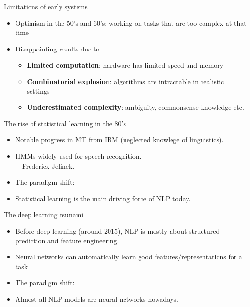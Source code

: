 \documentclass[usenames,dvipsnames,notes,11pt,aspectratio=169]{beamer}
\begin{document}
\begin{frame}
    {Limitations of early systems}
    \begin{itemize}
        \itemsep1em
        \item Optimism in the 50's and 60's: working on tasks that are too complex at that time\\[1ex]
        \item Disappointing results due to
            \begin{itemize}
                \item \textbf{Limited computation}: hardware has limited speed and memory 
                \item \textbf{Combinatorial explosion}: algorithms are intractable in realistic settings
                \item \textbf{Underestimated complexity}: ambiguity, commonsense knowledge etc.
            \end{itemize}
    \end{itemize}
\end{frame}

\begin{frame}
    {The rise of statistical learning in the 80's}
    \begin{itemize}
        \itemsep1em
        \item Notable progress in MT from IBM (neglected knowlege of linguistics).
        \item HMMs widely used for speech recognition.\\
            ---Frederick Jelinek.
        \item The paradigm shift: 
        \item Statistical learning is the main driving force of NLP today.
    \end{itemize}
\end{frame}

\begin{frame}
    {The deep learning tsunami}
    \begin{itemize}
        \itemsep1em
        \item Before deep learning (around 2015), NLP is mostly about structured prediction and feature engineering.
        \item Neural networks can automatically learn good features/representations for a task 
        \item The paradigm shift: 
        \item Almost all NLP models are neural networks nowadays.
    \end{itemize}
\end{frame}
\end{document}
